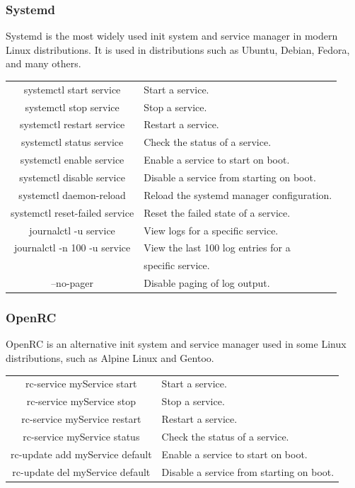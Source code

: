 \documentclass[10pt]{article}
\begin{document}
\begin{multicols}{2}
\subsubsection{Systemd}
Systemd is the most widely used init system and service manager in modern Linux distributions.
It is used in distributions such as Ubuntu, Debian, Fedora, and many others.\\
\begin{tabular}{C L}
    systemctl start service     & Start a service. \\
    systemctl stop service      & Stop a service. \\
    systemctl restart service   & Restart a service. \\
    systemctl status service    & Check the status of a service. \\
    systemctl enable service    & Enable a service to start on boot. \\
    systemctl disable service   & Disable a service from starting on boot. \\
    systemctl daemon-reload     & Reload the systemd manager configuration. \\
    systemctl reset-failed service     & Reset the failed state of a service. \\

    journalctl -u service        & View logs for a specific service. \\
    journalctl -n 100 -u service & View the last 100 log entries for a\\
                                 & specific service. \\
    --no-pager                   & Disable paging of log output. \\
\end{tabular}

\subsubsection{OpenRC}
OpenRC is an alternative init system and service manager used in some Linux distributions, such as Alpine Linux and Gentoo.\\
\begin{tabular}{C L}
rc-service myService start & Start a service. \\
rc-service myService stop  & Stop a service. \\
rc-service myService restart & Restart a service. \\
rc-service myService status  & Check the status of a service. \\
rc-update add myService default & Enable a service to start on boot. \\
rc-update del myService default & Disable a service from starting on boot. \\
\end{tabular}


\end{multicols}
\end{document}
